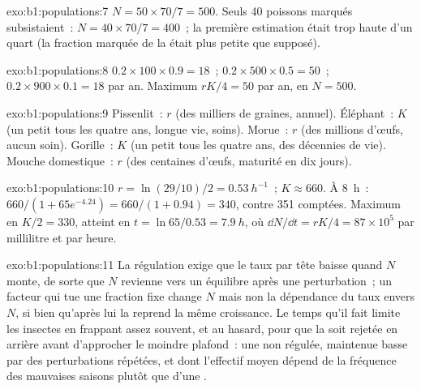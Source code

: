 \begin{solution}{exo:b1:populations:7}
$N = 50\times 70/7 = 500$. Seuls 40 poissons marqués subsistaient~: $N = 40\times
70/7 = 400$~; la première estimation était trop haute d'un quart (la
fraction marquée de la  était plus petite que supposé).
\end{solution}

\begin{solution}{exo:b1:populations:8}
$0.2\times 100\times 0.9 = 18$~; $0.2\times 500\times 0.5 = 50$~;
$0.2\times 900\times 0.1 = 18$ par an. Maximum $rK/4 = 50$ par an, en
$N = 500$.
\end{solution}

\begin{solution}{exo:b1:populations:9}
Pissenlit~: $r$ (des milliers de graines, annuel). Éléphant~: $K$ (un
petit tous les quatre ans, longue vie, soins). Morue~: $r$ (des millions
d'œufs, aucun soin). Gorille~: $K$ (un petit tous les quatre ans, des
décennies de vie). Mouche domestique~: $r$ (des centaines d'œufs,
maturité en dix jours).
\end{solution}

\begin{solution}{exo:b1:populations:10}
$r = \ln(29/10)/2 = \qty{0.53}{h^{-1}}$~; $K \approx 660$. À \qty{8}{h}~:
$660/(1 + 65e^{-4.24}) = 660/(1 + 0.94) = 340$, contre 351 comptées.
Maximum en $K/2 = 330$, atteint en $t = \ln 65/0.53 = \qty{7.9}{h}$, où
$\dd N/\dd t = rK/4 = 87\times 10^5$  par millilitre et par
heure.
\end{solution}

\begin{solution}{exo:b1:populations:11}
La régulation exige que le taux par tête baisse quand $N$ monte, de
sorte que $N$ revienne vers un équilibre après une perturbation~; un
facteur qui tue une fraction fixe change $N$ mais non la dépendance du
taux envers $N$, si bien qu'après lui la  reprend la même
croissance. Le temps qu'il fait limite les insectes en frappant assez
souvent, et au hasard, pour que la  soit rejetée en arrière
avant d'approcher le moindre plafond~: une  non régulée,
maintenue basse par des perturbations répétées, et dont l'effectif
moyen dépend de la fréquence des mauvaises saisons plutôt que d'une
.
\end{solution}

